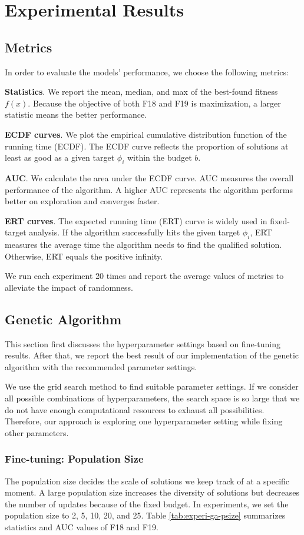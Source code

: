 \documentclass{article}
\begin{document}
\section{Experimental Results}\label{sec:experi}
\subsection{Metrics}
In order to evaluate the models' performance, we choose the following metrics:

\textbf{Statistics}. We report the mean, median, and max of the best-found fitness $f(x)$. Because the objective of both F18 and F19 is maximization, a larger statistic means the better performance.

\textbf{ECDF curves}. We plot the empirical cumulative distribution function of the running time (ECDF). The ECDF curve reflects the proportion of solutions at least as good as a given target $\phi_i$ within the budget $b$.

\textbf{AUC}. We calculate the area under the ECDF curve. AUC measures the overall performance of the algorithm. A higher AUC represents the algorithm performs better on exploration and converges faster.

\textbf{ERT curves}. The expected running time (ERT) curve is widely used in fixed-target analysis. If the algorithm successfully hits the given target $\phi_i$, ERT measures the average time the algorithm needs to find the qualified solution. Otherwise, ERT equals the positive infinity.

We run each experiment 20 times and report the average values of metrics to alleviate the impact of randomness.

\subsection{Genetic Algorithm}
This section first discusses the hyperparameter settings based on fine-tuning results. After that, we report the best result of our implementation of the genetic algorithm with the recommended parameter settings.

We use the grid search method to find suitable parameter settings. If we consider all possible combinations of hyperparameters, the search space is so large that we do not have enough computational resources to exhaust all possibilities. Therefore, our approach is exploring one hyperparameter setting while fixing other parameters.

\subsubsection{Fine-tuning: Population Size}
The population size decides the scale of solutions we keep track of at a specific moment. A large population size increases the diversity of solutions but decreases the number of updates because of the fixed budget. In experiments, we set the population size to 2, 5, 10, 20, and 25. Table \ref{tab:experi-ga-psize} summarizes statistics and AUC values of F18 and F19.
\end{document}

